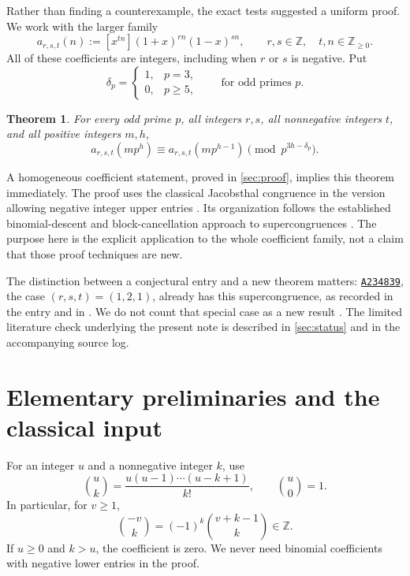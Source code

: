 \documentclass[11pt,a4paper]{article}
\numberwithin{equation}{section}
\theoremstyle{research}
\newtheorem{theorem}{Theorem}[section]
\theoremstyle{definition}
\newcommand{\Z}{\mathbb Z}
\newcommand{\oeis}[1]{\href{https://oeis.org/#1}{\texttt{#1}}}
\begin{document}
Rather than finding a counterexample, the exact tests suggested a uniform
proof. We work with the larger family
\begin{equation}\label{eq:family}
 a_{r,s,t}(n):=[x^{tn}](1+x)^{rn}(1-x)^{sn},
 \qquad r,s\in\Z,\quad t,n\in\Z_{\ge0}.
\end{equation}
All of these coefficients are integers, including when $r$ or $s$ is
negative. Put
\begin{equation}\label{eq:delta}
 \delta_p=\begin{cases}1,&p=3,\\0,&p\ge5,\end{cases}
 \qquad\text{for odd primes }p.
\end{equation}

\begin{theorem}\label{thm:family}
For every odd prime $p$, all integers $r,s$, all nonnegative integers $t$,
and all positive integers $m,h$,
\begin{equation}\label{eq:main}
 a_{r,s,t}(mp^h)\equiv a_{r,s,t}(mp^{h-1})
                  \pmod{p^{3h-\delta_p}}.
\end{equation}
\end{theorem}

A homogeneous coefficient statement, proved in \cref{sec:proof}, implies
this theorem immediately. The proof uses the classical Jacobsthal
congruence in the version allowing negative integer upper entries
\cite[Lemma 5.1]{Straub}. Its organization follows the established
binomial-descent and block-cancellation approach to supercongruences
\cite[Section 2]{OSS}. The purpose here is the explicit application to the
whole coefficient family, not a claim that those proof techniques are new.

The distinction between a conjectural entry and a new theorem matters:
\oeis{A234839}, the case $(r,s,t)=(1,2,1)$, already has this
supercongruence, as recorded in the entry and in
\cite[Example 3.3]{OSS}. We do not count that special case as a new result
\cite{A234839}. The limited literature check underlying the present note
is described in \cref{sec:status} and in the accompanying source log.

\section{Elementary preliminaries and the classical input}
\label{sec:prelim}
For an integer $u$ and a nonnegative integer $k$, use
\[
 \binom uk=\frac{u(u-1)\cdots(u-k+1)}{k!},\qquad \binom u0=1.
\]
In particular, for $v\ge1$,
\begin{equation}\label{eq:negative}
 \binom{-v}{k}=(-1)^k\binom{v+k-1}{k}\in\Z.
\end{equation}
If $u\ge0$ and $k>u$, the coefficient is zero. We never need binomial
coefficients with negative lower entries in the proof.
\end{document}
